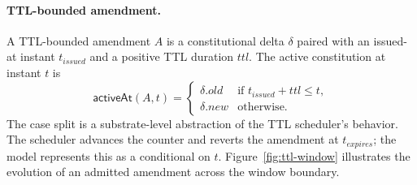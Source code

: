 \paragraph{TTL-bounded amendment.}
A TTL-bounded amendment $A$ is a constitutional delta $\delta$ paired
with an issued-at instant $\mathit{t_{\text{issued}}}$ and a positive
TTL duration $\mathit{ttl}$. The active constitution at instant $t$ is
\[
  \mathsf{activeAt}(A, t) =
  \begin{cases}
    \delta.\mathit{old} & \text{if } \mathit{t_{\text{issued}}} + \mathit{ttl} \le t, \\
    \delta.\mathit{new} & \text{otherwise.}
  \end{cases}
\]
The case split is a substrate-level abstraction of the TTL scheduler's
behavior. The scheduler advances the counter and reverts the amendment
at $\mathit{t_{\text{expires}}}$; the model represents this as a
conditional on $t$. Figure~\ref{fig:ttl-window} illustrates the
evolution of an admitted amendment across the window boundary.

